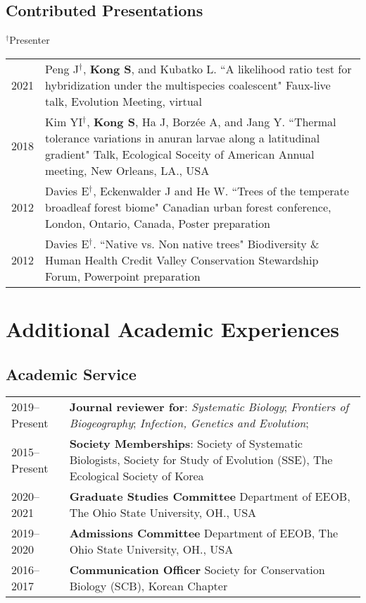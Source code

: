 \documentclass[11pt]{article}
\begin{document}
\subsection*{Contributed Presentations}
$^\dag$Presenter
\begin{longtable}{p{}  p{}}
2021 & Peng J$^\dag$, \textbf{Kong S}, and Kubatko L. ``A likelihood ratio test for hybridization under the multispecies coalescent" Faux-live talk, Evolution Meeting, virtual \vspace{10pt} \\ 
2018 & Kim YI$^\dag$, \textbf{Kong S}, Ha J, Borzée A, and Jang Y. ``Thermal tolerance variations in anuran larvae along a latitudinal gradient" Talk, Ecological Soceity of American Annual meeting, New Orleans, LA., USA \vspace{10pt} \\ 
2012 & Davies E$^\dag$, Eckenwalder J and He W. ``Trees of the temperate broadleaf forest biome"
Canadian urban forest conference, London, Ontario, Canada, Poster preparation \vspace{10pt} \\ 
2012 & Davies E$^\dag$. ``Native vs. Non native trees" Biodiversity \& Human Health Credit Valley Conservation Stewardship Forum, Powerpoint preparation \vspace{10pt} \\ 
\end{longtable}

\hspace{0pt}





\section*{Additional Academic Experiences}

\subsection*{Academic Service}
\begin{longtable}{p{}  p{}}
2019--Present &	\textbf{Journal reviewer for}: \textit{Systematic Biology}; \textit{Frontiers of Biogeography}; \textit{Infection, Genetics and Evolution};\\
2015--Present &  \textbf{Society Memberships}: Society of Systematic Biologists, Society for Study of Evolution (SSE), The Ecological Society of Korea\\

2020--2021 &  \textbf{Graduate Studies Committee} Department of EEOB, The Ohio State University, OH., USA\\
2019--2020 &	\textbf{Admissions Committee} Department of EEOB, The Ohio State University, OH., USA\\
2016--2017 &	\textbf{Communication Officer} Society for Conservation Biology (SCB), Korean Chapter\vspace{10pt}\\
\end{longtable}
\end{document}
